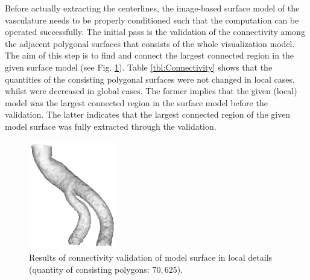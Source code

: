 Before actually extracting the centerlines, the image-based surface model of the vasculature needs to be properly conditioned such that the computation can be operated successfully. %
The initial pass is the validation of the connectivity among the adjacent polygonal surfaces that consists of the whole visualization model.
The aim of this step is to find and connect the largest connected region in the given surface model (see Fig. \ref{fig:ConnectivityLocal}).
Table \ref{tbl:Connectivity} shows that the quantities of the consisting polygonal surfaces were not changed in local cases, whilst were decreased in global cases.
The former implies that the given (local) model was the largest connected region in the surface model before the validation.
The latter indicates that the largest connected region of the given model surface was fully extracted through the validation.
\begin{figure}[t]
\centering
\includegraphics[width=1.5in]{Figures/chap05/connectivity_local.png}
\caption{Results of connectivity validation of model surface in local details (quantity of consisting polygons: $70,625$).}
\label{fig:ConnectivityLocal}
\end{figure}

